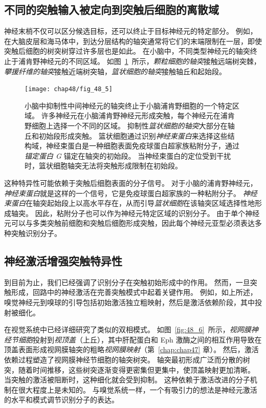 \subsection{不同的突触输入被定向到突触后细胞的离散域}


神经末梢不仅可以区分候选目标，还可以终止于目标神经元的特定部分。
例如，在大脑皮层和海马体中，到达分层结构的轴突通常将它们的末端限制在一层，即使突触后细胞的树突树穿过许多层也是如此。
在小脑中，不同类型神经元的轴突终止于浦肯野神经元的不同区域。
如图~\ref{fig:48_5}~所示，\textit{颗粒细胞的轴突}接触远端树突棘，\textit{攀援纤维的轴突}接触近端树突轴，\textit{篮状细胞的轴突}接触轴丘和起始段。


\begin{figure}[htbp]
	\centering
	\texttt{[image: chap48/fig\_48\_5]}
	\caption{小脑中抑制性中间神经元的轴突终止于小脑浦肯野细胞的一个特定区域。
		许多神经元在小脑浦肯野神经元形成突触，每个神经元在浦肯野细胞上选择一个不同的区域。
		抑制性\textit{篮状细胞的轴突}大部分在轴丘和初始段形成突触。
		篮状细胞通过识别\textit{神经束蛋白}来选择这些结构域，神经束蛋白是一种细胞表面免疫球蛋白超家族粘附分子，通过\textit{锚定蛋白 G} 锚定在轴突的初始段。
		当神经束蛋白的定位受到干扰时，篮状细胞轴突无法将突触形成限制在初始段\cite{huang2006subcellular}。}
	\label{fig:48_5}
\end{figure}


这种特异性可能依赖于突触后细胞表面的分子信号。
对于小脑的浦肯野神经元，\textit{神经束蛋白}就是这样的一个信号，它是免疫球蛋白超家族的一种粘附分子。
\textit{神经束蛋白}在轴突起始段上以高水平存在，从而引导\textit{篮状细胞}在该轴突区域选择性地形成轴突。
因此，粘附分子也可以作为神经元特定区域的识别分子。
由于单个神经元可以与多类突触前细胞和突触后细胞形成突触，因此每个神经元亚型必须表达多种突触识别分子。



\subsection{神经激活增强突触特异性}


到目前为止，我们已经强调了识别分子在突触初始形成中的作用。
然而，一旦突触形成，回路中的神经激活在完善突触模式中起着关键作用。
例如，如上所述，嗅觉神经元到嗅球的引导包括初始激活独立粗映射，然后是激活依赖阶段，其中投射被细化。


在视觉系统中已经详细研究了类似的双相模式。
如图~\ref{fig:48_6}~所示，\textit{视网膜神经节细胞}投射到\textit{视顶盖}（上丘），其中肝配蛋白和 Eph 激酶之间的相互作用导致在顶盖表面形成视网膜轴突的粗略\textit{视网膜映射}（第~\ref{chap:chap47} 章）。
然后，激活依赖过程塑造了视网膜神经节细胞的轴突树突。
轴突最初形成广泛而分散的树突，随着时间推移，这些树突逐渐变得更密集但更集中，使顶盖映射更加清晰。
当突触的激活被阻断时，这种细化就会受到抑制。
这种依赖于激活改进的分子机制在很大程度上是未知的。
与嗅觉系统一样，一个有吸引力的想法是神经元激活的水平和模式调节识别分子的表达。


